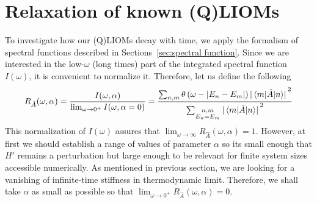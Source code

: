 \section{Relaxation of known (Q)LIOMs}
To investigate how our (Q)LIOMs decay with time, we apply the formalism of spectral functions
described in Sections~\ref{sec:spectral function}.
Since we are interested in the low-\(\omega\) (long times) part of the integrated spectral function
\(I(\omega)\), it is convenient to normalize it. Therefore, let us define the
following~\autocite{Mierzejewski2015Approx}
\begin{equation}
  R_{\hat{A}}(\omega,\alpha) = \frac{I(\omega,\alpha)}{\lim_{\omega \to 0^{+}} I(\omega,\alpha=0)} = 
  \frac{\sum_{n,m}\theta\left(\omega -\abs{E_n-E_m}\right) \abs*{\matrixel{m}{\hat{A}}{n}}^2}
  {\sum_{\substack{n,m \\ E_n=E_m}} \abs*{\matrixel{m}{\hat{A}}{n}}^2}
  \label{eq:normalized integrated spectral function}
\end{equation}
This normalization of \(I(\omega)\) assures that  \(\lim_{\omega\to \infty} R_{\hat{A}}
(\omega,\alpha) = 1\). However, at first we should establish a range of values of
parameter \(\alpha\) so its small enough that \(H'\) remains a perturbation but large enough
to be relevant for finite system sizes accessible numerically. As mentioned in previous section,
we are looking for a vanishing of infinite-time stiffness in thermodynamic limit. Therefore, we shall
take \(\alpha\) as small as possible so that  \(\lim_{\omega\to 0^{+}} R_{\hat{A}}
(\omega,\alpha) = 0\).

